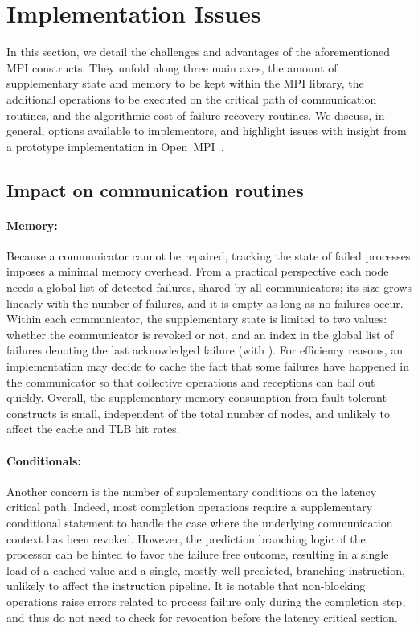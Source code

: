 \section{Implementation Issues}
\label{sect:algorithms}

In this section, we detail the challenges and advantages of the aforementioned
MPI constructs. They unfold along three main axes, the amount of supplementary
state and memory to be kept within the MPI library, the additional operations to
be executed on the critical path of communication routines, and the algorithmic
cost of failure recovery routines. We discuss, in general, options available to
implementors, and highlight issues with insight from a prototype implementation
in Open~MPI~\cite{gabriel04:_open_mpi}.

\subsection{Impact on communication routines}

\paragraph*{Memory:} Because a communicator cannot be repaired,
tracking the state of failed processes imposes a minimal memory overhead.  From
a practical perspective each node needs a global list of detected failures,
shared by all communicators; its size grows linearly with the number of
failures, and it is empty as long as no failures occur.  Within each
communicator, the supplementary state is limited to two values: whether the
communicator is revoked or not, and an index in the global list of failures
denoting the last acknowledged failure (with
). For efficiency reasons, an implementation
may decide to cache the fact that some failures have happened in the
communicator so that collective operations and 
receptions can bail out quickly. Overall, the supplementary memory consumption
from fault tolerant constructs is small, independent of the total number of
nodes, and unlikely to affect the cache and TLB hit rates.

\paragraph*{Conditionals:} Another concern is the number of supplementary
conditions on the latency critical path. Indeed, most completion operations
require a supplementary conditional statement to handle the case where the
underlying communication context has been revoked. However, the prediction
branching logic of the processor can be hinted to favor the failure free
outcome, resulting in a single load of a cached value and a single, mostly
well-predicted, branching instruction, unlikely to affect the instruction
pipeline. It is notable that non-blocking operations raise errors related to
process failure only during the completion step, and thus do not need to check
for revocation before the latency critical section.

